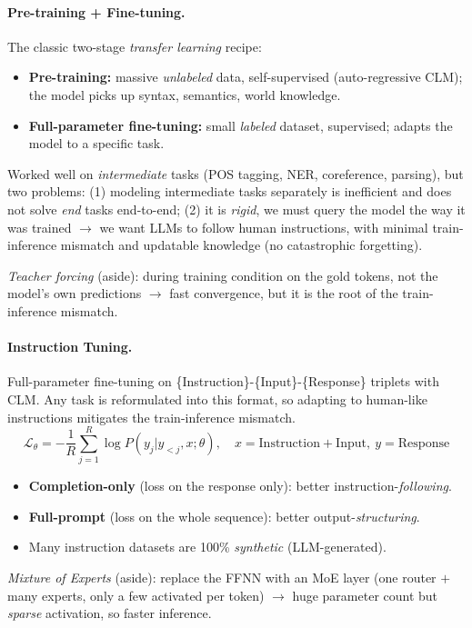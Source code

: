 \documentclass{article}
\begin{document}
\paragraph{Pre-training + Fine-tuning.} The classic two-stage \textit{transfer learning} recipe:
\begin{itemize}
    \item \textbf{Pre-training:} massive \textit{unlabeled} data, self-supervised (auto-regressive CLM); the model picks up syntax, semantics, world knowledge.
    \item \textbf{Full-parameter fine-tuning:} small \textit{labeled} dataset, supervised; adapts the model to a specific task.
\end{itemize}
Worked well on \textit{intermediate} tasks (POS tagging, NER, coreference, parsing), but two problems: (1) modeling intermediate tasks separately is inefficient and does not solve \textit{end} tasks end-to-end; (2) it is \textit{rigid}, we must query the model the way it was trained $\rightarrow$ we want LLMs to follow human instructions, with minimal train-inference mismatch and updatable knowledge (no catastrophic forgetting).

\textit{Teacher forcing} (aside): during training condition on the gold tokens, not the model's own predictions $\rightarrow$ fast convergence, but it is the root of the train-inference mismatch.

\paragraph{Instruction Tuning.} Full-parameter fine-tuning on \{Instruction\}-\{Input\}-\{Response\} triplets with CLM. Any task is reformulated into this format, so adapting to human-like instructions mitigates the train-inference mismatch.
$$
\mathcal{L}_\theta = -\frac{1}{R}\sum_{j=1}^R \log P(y_j|y_{<j},x;\theta), \quad x=\text{Instruction}+\text{Input},\ y=\text{Response}
$$
\begin{itemize}
    \item \textbf{Completion-only} (loss on the response only): better instruction-\textit{following}.
    \item \textbf{Full-prompt} (loss on the whole sequence): better output-\textit{structuring}.
    \item Many instruction datasets are 100\% \textit{synthetic} (LLM-generated).
\end{itemize}
\textit{Mixture of Experts} (aside): replace the FFNN with an MoE layer (one router $+$ many experts, only a few activated per token) $\rightarrow$ huge parameter count but \textit{sparse} activation, so faster inference.
\end{document}

